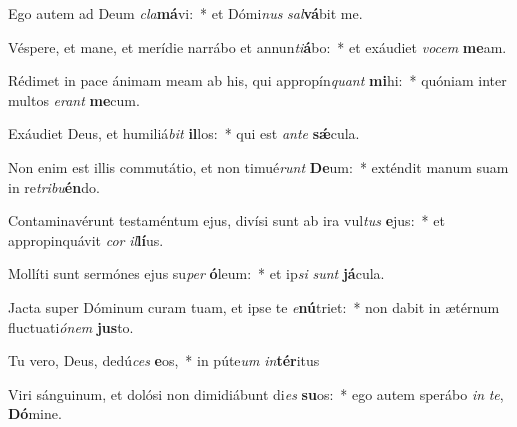 \item Ego autem ad Deum \textit{cla}\textbf{má}vi:~* et Dómi\textit{nus} \textit{sal}\textbf{vá}bit me.
\item Véspere, et mane, et merídie narrábo et annun\textit{ti}\textbf{á}bo:~* et exáudiet \textit{vo}\textit{cem} \textbf{me}am.
\item Rédimet in pace ánimam meam ab his, qui appropín\textit{quant} \textbf{mi}hi:~* quóniam inter multos \textit{e}\textit{rant} \textbf{me}cum.
\item Exáudiet Deus, et humiliá\textit{bit} \textbf{il}los:~* qui est \textit{an}\textit{te} \textbf{sǽ}cula.
\item Non enim est illis commutátio, et non timué\textit{runt} \textbf{De}um:~* exténdit manum suam in re\textit{tri}\textit{bu}\textbf{én}do.
\item Contaminavérunt testaméntum ejus, divísi sunt ab ira vul\textit{tus} \textbf{e}jus:~* et appropinquávit \textit{cor} \textit{il}\textbf{lí}us.
\item Mollíti sunt sermónes ejus su\textit{per} \textbf{ó}leum:~* et ip\textit{si} \textit{sunt} \textbf{já}cula.
\item Jacta super Dóminum curam tuam, et ipse te \textit{e}\textbf{nú}triet:~* non dabit in ætérnum fluctuati\textit{ó}\textit{nem} \textbf{jus}to.
\item Tu vero, Deus, dedú\textit{ces} \textbf{e}os,~* in púte\textit{um} \textit{in}\textbf{tér}itus
\item Viri sánguinum, et dolósi non dimidiábunt di\textit{es} \textbf{su}os:~* ego autem sperábo \textit{in} \textit{te}, \textbf{Dó}mine.
